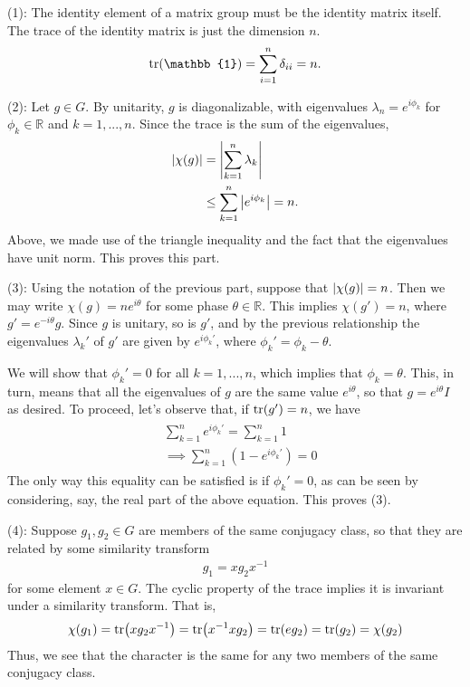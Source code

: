 \documentclass{book}
\begin{document}
    (1): The identity element of a matrix group must be the identity matrix itself. The trace of the identity matrix is just the dimension $n$.
    \begin{align}
        \tr(\mathbb{1}) = \sum_{i=1}^n \delta_{ii} = n.
    \end{align}
    
    (2): Let $g\in G$. By unitarity, $g$ is diagonalizable, with eigenvalues $\lambda_n = e^{i\phi_k}$ for $\phi_k\in \mathbb{R}$ and $k=1,...,n$. Since the trace is the sum of the eigenvalues,
    \begin{align}
        \abs{\chi(g)} &= \abs{\sum_{k=1}^n \lambda_k} \\
        &\leq \sum_{k=1}^n \abs{e^{i\phi_k}} = n.
    \end{align}
    Above, we made use of the triangle inequality and the fact that the eigenvalues have unit norm. This proves this part.
    
    (3): Using the notation of the previous part, suppose that $\abs{\chi(g)} = n$. Then we may write $\chi(g) = n e^{i\theta}$ for some phase $\theta\in \mathbb{R}$. This implies $\chi(g') = n$, where $g' = e^{-i\theta} g$. Since $g$ is unitary, so is $g'$, and by the previous relationship the eigenvalues $\lambda_k'$ of $g'$ are given by $e^{i\phi_k'}$, where $\phi_k'=\phi_k-\theta$. 
    
    We will show that $\phi_k' = 0$ for all $k = 1,...,n$, which implies that $\phi_k = \theta$. This, in turn, means that all the eigenvalues of $g$ are the same value $e^{i\theta}$, so that $g = e^{i\theta}I$ as desired. To proceed, let's observe that, if $\tr(g') = n$, we have 
    \begin{align}
    \begin{aligned}
        &\sum_{k=1}^n e^{i\phi_k'} = \sum_{k=1}^n 1 \\[6pt]
        &\implies \sum_{k=1}^n (1-e^{i\phi_k'}) = 0
    \end{aligned}
    \end{align}
    The only way this equality can be satisfied is if $\phi_{k}'=0$, as can be seen by considering, say, the real part of the above equation. This proves  (3).
    
    (4): Suppose $g_1, g_2 \in G$ are members of the same conjugacy class, so that they are related by some similarity transform 
    \begin{align}
        g_1 = x g_2 x^{-1}
    \end{align}
    for some element $x\in G$. The cyclic property of the trace implies it is invariant under a similarity transform. That is,
    \begin{align}
        \chi(g_1) = \tr(x g_2 x^{-1}) = \tr(x^{-1} x g_2) = \tr(e g_2) = \tr(g_2) = \chi(g_2)
    \end{align}
    Thus, we see that the character is the same for any two members of the same conjugacy class.
    
\end{document}

